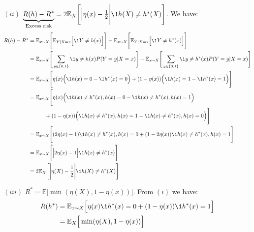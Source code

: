 \begin{proof*}
    \begin{subproof}{\newline $(ii)$ $\underbrace{R(h) - R^*}_{\text{Excess risk}} = 2\mathbb{E}_X\Bigg[ \Big| \eta(x) - \frac{1}{2}\Bigg| \1{h(X)\ne h^*(X)} \Bigg]$.}
        We have:
        \begin{align*}
            R(h) - R^* 
                &= \mathbb{E}_{x\sim X}\Bigg[
                    \mathbb{E}_{Y|X=x} \Big[ \1{Y \ne h(x)} \Big]
                \Bigg] - \mathbb{E}_{x\sim X}\Bigg[
                    \mathbb{E}_{Y|X=x} \Big[ \1{Y \ne h^*(x)} \Big]
                \Bigg] \\
                &= \mathbb{E}_{x\sim X}\Bigg[
                    \sum_{y\in\{0,1\}}\1{y \ne h(x)}P(Y=y|X=x)
                \Bigg] - \mathbb{E}_{x\sim X}\Bigg[
                    \sum_{y\in\{0,1\}}\1{y \ne h^*(x)}P(Y=y|X=x)
                \Bigg] \\
                &= \mathbb{E}_{x\sim X}\Bigg[
                    \eta(x)\Big( \1{h(x) = 0} - \1{h^*(x) = 0} \Big)
                    + (1 - \eta(x)) \Big( \1{h(x)=1} - \1{h^*(x) = 1} \Big)
                \Bigg] \\
                &= \mathbb{E}_{x\sim X}\Bigg[
                    \eta(x)\Big( \1{h(x) \ne h^*(x), h(x)=0} - \1{h(x) \ne h^*(x), h(x)=1} \Big) \\
                    & \ \ \ \ \ \ \ \ \ 
                    + (1 - \eta(x)) \Big( \1{h(x) \ne h^*(x), h(x)=1} - \1{h(x) \ne h^*(x), h(x)=0} \Big) 
                \Bigg] \\
                &= \mathbb{E}_{x\sim X}\Bigg[
                    (2\eta(x) - 1)\1{h(x) \ne h^*(x), h(x)=0} + (1 - 2\eta(x))\1{h(x) \ne h^*(x), h(x)=1}
                \Bigg] \\
                &= \mathbb{E}_{x\sim X}\Bigg[
                    \Big| 2\eta(x) - 1 \Big| \1{h(x) \ne h^*(x)}
                \Bigg] \\
                &= 2\mathbb{E}_X\Bigg[\Bigg| \eta(X) - \frac{1}{2} \Bigg|\1{h(X)\ne h^*(X)}\Bigg]
        \end{align*}
    \end{subproof}

    \begin{subproof}{\newline $(iii)$ $R^* = \mathbb{E}\Big[ \min(\eta(X), 1 - \eta(x)) \Big]$.}
        From $(i)$ we have:
        \begin{align*}
            R(h^*) &= \mathbb{E}_{x\sim X}\Big[ \eta(x)\1{h^*(x)=0} + (1 - \eta(x)) \1{h^*(x)=1} \Big] \\
            &= \mathbb{E}_X\Big[ \min(\eta(X), 1 - \eta(x)) \Big]
        \end{align*}
    \end{subproof}
\end{proof*}

